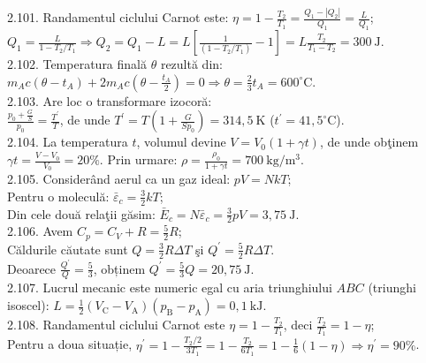 2.101. Randamentul ciclului Carnot este: $\eta=1-\frac{T_{2}}{T_{1}}=\frac{Q_{1}-\left|Q_{2}\right|}{Q_{1}}=\frac{L}{Q_{1}}$;\\ $Q_{1}=\frac{L}{1-T_{2} / T_{1}} \Rightarrow Q_{2}=Q_{1}-L=L\left[\frac{1}{\left(1-T_{2} / T_{1}\right)}-1\right]=L \frac{T_{2}}{T_{1}-T_{2}}=300 \mathrm{~J}$.\\

2.102. Temperatura finală $\theta$ rezultă din:\\ $m_{A} c\left(\theta-t_{A}\right)+2 m_{A} c\left(\theta-\frac{t_{A}}{2}\right)=0 \Rightarrow \theta=\frac{2}{3} t_{A}=600^{\circ} \mathrm{C}$.\\

2.103. Are loc o transformare izocoră:\\ $\frac{p_{0}+\frac{G}{S}}{p_{0}}=\frac{T^{\prime}}{T}$, de unde $T^{\prime}=T\left(1+\frac{G}{S p_{0}}\right)=314,5 \mathrm{~K}$ ($t^{\prime}=41,5^{\circ} \mathrm{C}$).\\

2.104. La temperatura $t$, volumul devine $V=V_{0}(1+\gamma t)$, de unde obţinem $\gamma t=\frac{V-V_{0}}{V_{0}}=20 \%$. Prin urmare: $\rho=\frac{\rho_{0}}{1+\gamma t}=700 \mathrm{~kg} / \mathrm{m}^{3}$.\\

2.105. Considerând aerul ca un gaz ideal: $p V=N k T$;\\ Pentru o moleculă: $\bar{\varepsilon}_{c}=\frac{3}{2} k T$;\\ Din cele două relaţii găsim: $\bar{E}_{c}=N \bar{\varepsilon}_{c}=\frac{3}{2} p V=3,75 \mathrm{~J}$.\\

2.106. Avem $C_{p}=C_{V}+R=\frac{5}{2} R$;\\ Căldurile căutate sunt $Q=\frac{3}{2} R \Delta T$ şi $Q^{\prime}=\frac{5}{2} R \Delta T$.\\ Deoarece $\frac{Q^{\prime}}{Q}=\frac{5}{3}$, obținem $Q^{\prime}=\frac{5}{3} Q=20,75 \mathrm{~J}$.\\

2.107. Lucrul mecanic este numeric egal cu aria triunghiului $A B C$ (triunghi isoscel): $L=\frac{1}{2}\left(V_{\mathrm{C}}-V_{\mathrm{A}}\right)\left(p_{\mathrm{B}}-p_{\mathrm{A}}\right)=0,1 \mathrm{~kJ}$.\\

2.108. Randamentul ciclului Carnot este $\eta=1-\frac{T_{2}}{T_{1}}$, deci $\frac{T_{2}}{T_{1}}=1-\eta$;\\ Pentru a doua situație, $\eta^{\prime}=1-\frac{T_{2} / 2}{3 T_{1}}=1-\frac{T_{2}}{6 T_{1}}=1-\frac{1}{6}(1-\eta) \Rightarrow \eta^{\prime}=90 \%$.\\

